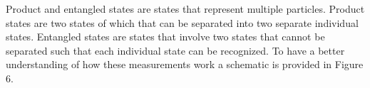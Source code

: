 \documentclass[twocolumn]{article}
\begin{document}
Product and entangled states are states that represent multiple particles. Product states are two states of which that can be separated into two separate individual states. Entangled states are states that involve two states that cannot be separated such that each individual state can be recognized. To have a better understanding of how these measurements work a schematic is provided in Figure 6.
\begin{figure}[ht]
    \centering
    \newcommand{\figsixcircarad}{0.25}
    \newcommand{\figsixcircaycent}{0.50}
    \newcommand{\figsixlineaxstart}{2*\figsixcircarad}
    \newcommand{\figsixlineaxend}{\figsixlineaxstart+1.25}
    \newcommand{\figsixlineay}{\figsixcircaycent}
    \newcommand{\figsixrectawidth}{2.5}
    \newcommand{\figsixrectaheight}{2*\figsixcircarad}
    \newcommand{\figsixrectax}{\figsixlineaxend}
    \newcommand{\figsixrectay}{0.5*\figsixrectaheight}
    \newcommand{\figsixlinebxstart}{\figsixlineaxend+\figsixrectawidth}
    \newcommand{\figsixlinebxend}{\figsixlinebxstart+1.25}
    \newcommand{\figsixlineby}{\figsixlineay}
    \newcommand{\figsixcircbrad}{0.25}
    \newcommand{\figsixcircbycent}{-0.50}
    \newcommand{\figsixlinecxstart}{2*\figsixcircbrad}
    \newcommand{\figsixlinecxend}{\figsixlinecxstart+1.25}
    \newcommand{\figsixlinecy}{\figsixcircbycent}
    \newcommand{\figsixrectbwidth}{2.5}
    \newcommand{\figsixrectbheight}{2*\figsixcircbrad}
    \newcommand{\figsixrectbx}{\figsixlinecxend}
    \newcommand{\figsixrectby}{-1.5*\figsixrectbheight}
    \newcommand{\figsixlinedxstart}{\figsixlinecxend+\figsixrectbwidth}
    \newcommand{\figsixlinedxend}{\figsixlinedxstart+1.25}
    \newcommand{\figsixlinedy}{\figsixlinecy}
\end{figure}
\end{document}
